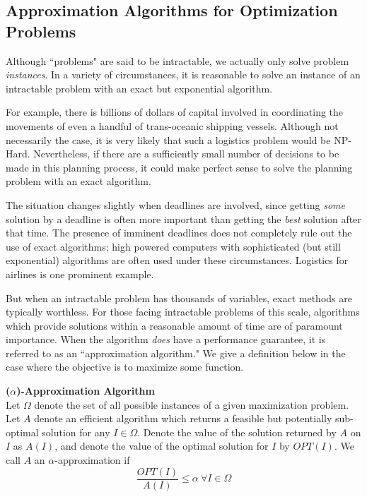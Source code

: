 \subsection{Approximation Algorithms for Optimization Problems}\label{subsec:intractProbCope}

Although ``problems" are said to be intractable, we actually only solve problem \textit{instances}. 
In a variety of circumstances, it is reasonable to solve an instance of an intractable problem with an exact but exponential algorithm.

For example, there is billions of dollars of capital involved in coordinating the movements of even a handful of trans-oceanic shipping vessels. 
Although not necessarily the case, it is very likely that such a logistics problem would be NP-Hard.
Nevertheless, if there are a sufficiently small number of decisions to be made in this planning process, it could make perfect sense to solve the planning problem with an exact algorithm.

The situation changes slightly when deadlines are involved, since getting \textit{some} solution by a deadline is often more important than getting the \textit{best} solution after that time. 
The presence of imminent deadlines does not completely rule out the use of exact algorithms; high powered computers with sophisticated (but still exponential) algorithms are often used under these circumstances. 
Logistics for airlines is one prominent example.

But when an intractable problem has thousands of variables, exact methods are typically worthless. 
For those facing intractable problems of this scale, algorithms which provide solutions within a reasonable amount of time are of paramount importance.  
When the algorithm \textit{does} have a performance guarantee, it is referred to as an ``approximation algorithm."
We give a definition below in the case where the objective is to maximize some function. 

\begin{definition}
\textbf{($\alpha$)-Approximation Algorithm} \\
Let $\Omega$ denote the set of all possible instances of a given maximization problem. 
Let $A$ denote an efficient algorithm which returns a feasible but potentially sub-optimal solution for any $I \in \Omega$. 
Denote the value of the solution returned by $A$ on $I$ as $A(I)$, and denote the value of the optimal solution for $I$ by $OPT(I)$. We call $A$ an $\alpha$-approximation if
\begin{equation*}
\frac{OPT(I)}{A(I)} \leq \alpha ~ \forall I \in \Omega
\end{equation*}
\label{def:commonApproxAlg}
\end{definition}

